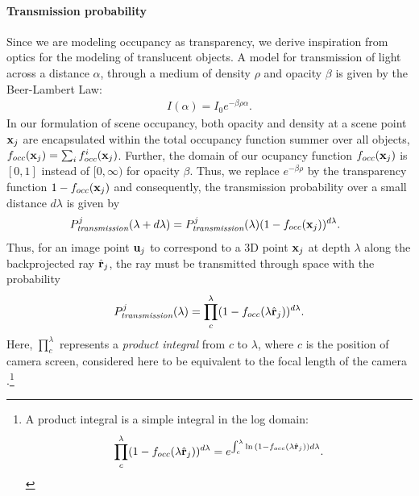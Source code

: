 \paragraph{Transmission probability}
\label{sec:ptransmission}
Since we are modeling occupancy as transparency, we derive inspiration from optics for the modeling of translucent objects. A model for transmission of light across a distance $\alpha$, through a medium of density $\rho$ and opacity $\beta$ is given by the Beer-Lambert Law:
\begin{align}
I(\alpha) = I_0 e^{-\beta\rho\alpha}.
\end{align}
%
In our formulation of scene occupancy, both opacity and density at a scene point $\mathbf{x}_j$ are encapsulated within the total occupancy function summer over all objects, $f_{occ}(\mathbf{x}_j) = \sum_i f^i_{occ}(\mathbf{x}_j)$. Further, the domain of our ocupancy function $f_{occ}(\mathbf{x}_j)$ is $[0, 1]$ instead of $[0, \infty)$ for opacity $\beta$. Thus, we replace $e^{-\beta\rho}$ by the transparency function $1 - f_{occ}(\mathbf{x}_j)$ and consequently, the transmission probability over a small distance $d\lambda$ is given by
%
\begin{align}
  \!\!\!\! P^j_{\textit{transmission}}(\lambda + d\lambda) = P^j_{\textit{transmission}}(\lambda) (1-f_{occ}(\mathbf{x}_j))^{d\lambda}.
\end{align}
%
Thus, for an image point $\mathbf{u}_j$ to correspond to a 3D point $\mathbf{x}_j$ at depth $\lambda$ along the backprojected ray $\hat{\mathbf{r}}_j$, the ray must be transmitted through space with the probability
\begin{align}
P^j_{\textit{transmission}}(\lambda) = \prod_{c}^{\lambda} (1 - f_{occ}(\lambda \hat{\mathbf{r}}_j))^{d\lambda}.
\label{eq:ptrans-integral}
\end{align}
Here, $\prod_{c}^{\lambda}$ represents a \emph{product integral} from $c$ to $\lambda$, where $c$ is the position of camera screen, considered here to be equivalent to the focal length of the camera .\footnote{A product integral is a simple integral in the log domain: 
\vspace{-0.2cm}
\begin{equation}
\prod_{c}^{\lambda} (1 - f_{occ}(\lambda \hat{\mathbf{r}}_j))^{d\lambda} = e^{\int_{c}^{\lambda} \ln{(1 - f_{occ}(\lambda \hat{\mathbf{r}}_j))}{d\lambda}}. \nonumber
\end{equation}
}


